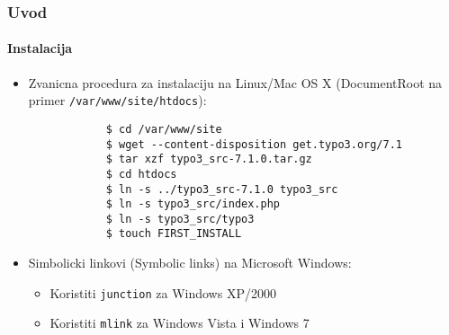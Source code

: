 \begin{frame}[fragile]
	\frametitle{Uvod}
	\framesubtitle{Instalacija}

	\begin{itemize}
		\item Zvanicna procedura za instalaciju na Linux/Mac OS X\newline
			(DocumentRoot na primer \texttt{/var/www/site/htdocs}):
		\begin{lstlisting}
			$ cd /var/www/site
			$ wget --content-disposition get.typo3.org/7.1
			$ tar xzf typo3_src-7.1.0.tar.gz
			$ cd htdocs
			$ ln -s ../typo3_src-7.1.0 typo3_src
			$ ln -s typo3_src/index.php
			$ ln -s typo3_src/typo3
			$ touch FIRST_INSTALL
		\end{lstlisting}

		\item Simbolicki linkovi (Symbolic links) na Microsoft Windows:

			\begin{itemize}
				\item Koristiti \texttt{junction} za Windows XP/2000
				\item Koristiti  \texttt{mlink} za Windows Vista i Windows 7
			\end{itemize}

	\end{itemize}
\end{frame}


